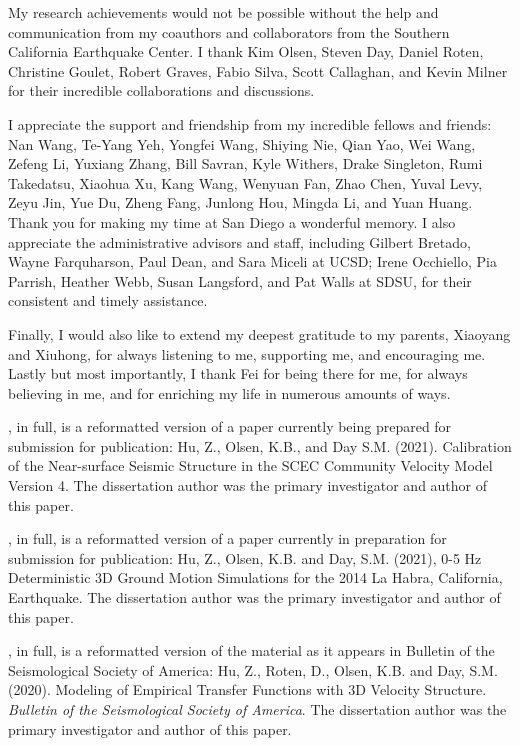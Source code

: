 \begin{frontmatter}
\begin{acknowledgements}
        My research achievements would not be possible without the help and communication from my coauthors and collaborators from the Southern California Earthquake Center. I thank Kim Olsen, Steven Day, Daniel Roten, Christine Goulet, Robert Graves, Fabio Silva, Scott Callaghan, and Kevin Milner for their incredible collaborations and discussions.

        I appreciate the support and friendship from my incredible fellows and friends: Nan Wang, Te-Yang Yeh, Yongfei Wang, Shiying Nie, Qian Yao, Wei Wang, Zefeng Li, Yuxiang Zhang, Bill Savran, Kyle Withers, Drake Singleton, Rumi Takedatsu, Xiaohua Xu, Kang Wang, Wenyuan Fan, Zhao Chen, Yuval Levy, Zeyu Jin, Yue Du, Zheng Fang, Junlong Hou, Mingda Li, and Yuan Huang. Thank you for making my time at San Diego a wonderful memory. I also appreciate the administrative advisors and staff, including Gilbert Bretado, Wayne Farquharson, Paul Dean, and Sara Miceli at UCSD; Irene Occhiello, Pia Parrish, Heather Webb, Susan Langsford, and Pat Walls at SDSU, for their consistent and timely assistance.

        Finally, I would also like to extend my deepest gratitude to my parents, Xiaoyang and Xiuhong, for always listening to me, supporting me, and encouraging me. Lastly but most importantly, I thank Fei for being there for me, for always believing in me, and for enriching my life in numerous amounts of ways.

        \bigskip

        
        , in full, is a reformatted version of a paper currently being prepared for submission for publication: Hu, Z., Olsen, K.B., and Day S.M. (2021). Calibration of the Near-surface Seismic Structure in the SCEC Community Velocity Model Version 4.
        The dissertation author was the primary investigator and author of this paper.
        
        , in full, is a reformatted version of a paper currently in preparation for submission for publication: Hu, Z., Olsen, K.B. and Day, S.M. (2021), 0-5 Hz Deterministic 3D Ground Motion Simulations for the 2014 La Habra, California, Earthquake. The dissertation author was the primary investigator and author of this paper.
        
        , in full, is a reformatted version of the material as it appears in Bulletin of the Seismological Society of America: Hu, Z., Roten, D., Olsen, K.B. and Day, S.M. (2020). Modeling of Empirical Transfer Functions with 3D Velocity Structure. \emph{Bulletin of the Seismological Society of America}. The dissertation author was the primary investigator and author of this paper.
        

\end{acknowledgements}
\end{frontmatter}
